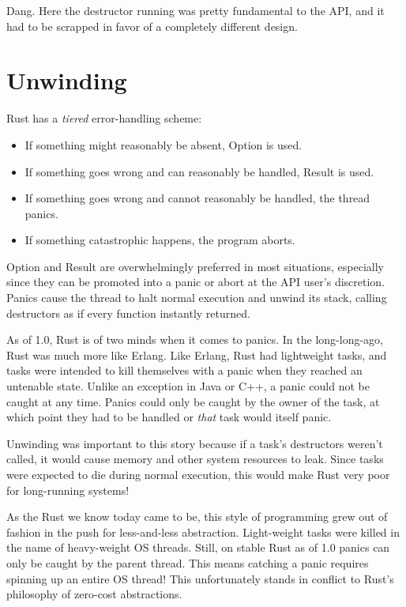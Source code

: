 \documentclass[a4paper,]{book}
\providecommand{\tightlist}{%
  \setlength{\itemsep}{0pt}\setlength{\parskip}{0pt}}
\begin{document}
Dang. Here the destructor running was pretty fundamental to the API, and
it had to be scrapped in favor of a completely different design.

\hypertarget{sec--unwinding}{\chapter{Unwinding}\label{sec--unwinding}}

Rust has a \emph{tiered} error-handling scheme:

\begin{itemize}
\tightlist
\item
  If something might reasonably be absent, Option is used.
\item
  If something goes wrong and can reasonably be handled, Result is used.
\item
  If something goes wrong and cannot reasonably be handled, the thread
  panics.
\item
  If something catastrophic happens, the program aborts.
\end{itemize}

Option and Result are overwhelmingly preferred in most situations,
especially since they can be promoted into a panic or abort at the API
user's discretion. Panics cause the thread to halt normal execution and
unwind its stack, calling destructors as if every function instantly
returned.

As of 1.0, Rust is of two minds when it comes to panics. In the
long-long-ago, Rust was much more like Erlang. Like Erlang, Rust had
lightweight tasks, and tasks were intended to kill themselves with a
panic when they reached an untenable state. Unlike an exception in Java
or C++, a panic could not be caught at any time. Panics could only be
caught by the owner of the task, at which point they had to be handled
or \emph{that} task would itself panic.

Unwinding was important to this story because if a task's destructors
weren't called, it would cause memory and other system resources to
leak. Since tasks were expected to die during normal execution, this
would make Rust very poor for long-running systems!

As the Rust we know today came to be, this style of programming grew out
of fashion in the push for less-and-less abstraction. Light-weight tasks
were killed in the name of heavy-weight OS threads. Still, on stable
Rust as of 1.0 panics can only be caught by the parent thread. This
means catching a panic requires spinning up an entire OS thread! This
unfortunately stands in conflict to Rust's philosophy of zero-cost
abstractions.
\end{document}
